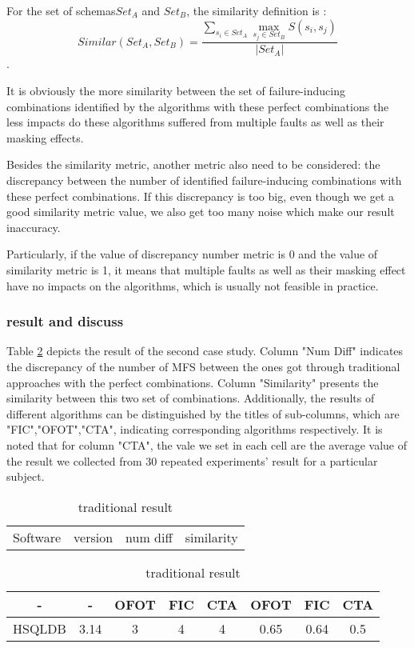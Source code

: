 \documentclass{sig-alternate}
\begin{document}
For the set of schemas$ Set_{A}$ and $Set_{B}$, the similarity definition is :
\begin{displaymath} Similar(Set_{A},Set_{B})= \frac{\sum _{s_{i}\in Set_{A}}\max _{s_{j}\in Set_{B}}S\left( s_{i},s_{j}\right)}{|Set_{A}|} \end{displaymath}.

It is obviously the more similarity between the set of failure-inducing combinations identified by the algorithms with these perfect combinations the less impacts do these algorithms suffered from multiple faults as well as their masking effects.

Besides the similarity metric, another metric also need to be considered: the discrepancy between the number of identified failure-inducing combinations with these perfect combinations. If this discrepancy is too big, even though we get a good similarity metric value, we also get too many noise which make our result inaccuracy.

Particularly, if the value of discrepancy number metric is 0 and the value of similarity metric is 1, it means that multiple faults as well as their masking effect have no impacts on the algorithms, which is usually not feasible in practice.

\subsubsection{result and discuss}
Table \ref{traiditional_result} depicts the result of the second case study. Column "Num Diff" indicates the discrepancy of the number of MFS between the ones got through traditional approaches with the perfect combinations. Column "Similarity" presents the similarity between this two set of combinations. Additionally, the results of different algorithms can be distinguished by the titles of sub-columns, which are "FIC","OFOT","CTA", indicating corresponding algorithms respectively. It is noted that for column "CTA", the vale we set in each cell are the average value of the result we collected from 30 repeated experiments' result for a particular subject.

\begin{table}\renewcommand{\arraystretch}{1.3}
\caption{traditional result}
\label{traiditional_result}
\begin{tabular}{p{}|p{}|p{}|p{}} \hline
   Software & version  &  num diff & similarity
\end{tabular}

\begin{tabular}{c|c|c|c|c|c|c|c} \hline
	- & 		- &	OFOT	& FIC 	& CTA 	& OFOT 	& FIC 	& CTA  \\ \hline
HSQLDB &	 3.14 &	3	& 4 		& 4 		& 0.65 	& 0.64	&  0.5 \\
\hline\end{tabular}
\end{table}
\end{document}
